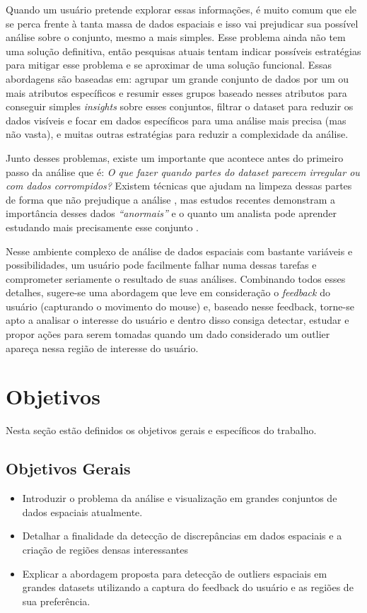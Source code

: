 Quando um usuário pretende explorar essas informações, é muito comum que ele se perca frente à tanta massa de dados espaciais e isso vai prejudicar sua possível análise sobre o conjunto, mesmo a mais simples. Esse problema ainda não tem uma solução definitiva, então pesquisas atuais tentam indicar possíveis estratégias para mitigar esse problema e se aproximar de uma solução funcional. Essas abordagens são baseadas em: agrupar um grande conjunto de dados por um ou mais atributos específicos e resumir esses grupos baseado nesses atributos para conseguir simples \textit{insights} sobre esses conjuntos, filtrar o dataset para reduzir os dados visíveis e focar em dados específicos para uma análise mais precisa (mas não vasta), e muitas outras estratégias para reduzir a complexidade da análise.

Junto desses problemas, existe um importante que acontece antes do primeiro passo da análise que é: \textit{O que fazer quando partes do dataset parecem irregular ou com dados corrompidos?} Existem técnicas que ajudam na limpeza dessas partes de forma que não prejudique a análise \cite{10.1007/978-3-319-11116-2_2}, mas estudos recentes demonstram a importância desses dados \textit{``anormais''} e o quanto um analista pode aprender estudando mais precisamente esse conjunto \cite{DBLP:journals/debu/FreireCVZ16}.

Nesse ambiente complexo de análise de dados espaciais com bastante variáveis e possibilidades, um usuário pode facilmente falhar numa dessas tarefas e comprometer seriamente o resultado de suas análises. Combinando todos esses detalhes, sugere-se uma abordagem que leve em consideração o \textit{feedback} do usuário (capturando o movimento do mouse) e, baseado nesse feedback, torne-se apto a analisar o interesse do usuário e dentro disso consiga detectar, estudar e propor ações para serem tomadas quando um dado considerado um outlier apareça nessa região de interesse do usuário.

\section{Objetivos}

Nesta seção estão definidos os objetivos gerais e específicos do trabalho.

\subsection{Objetivos Gerais}

\begin{itemize}
	\item
		Introduzir o problema da análise e visualização em grandes conjuntos de dados espaciais atualmente.
	\item 
		Detalhar a finalidade da detecção de discrepâncias em dados espaciais e a criação de regiões densas interessantes
	\item
	      Explicar a abordagem proposta para detecção de outliers espaciais em grandes datasets utilizando a captura do feedback do usuário e as regiões de sua preferência.

\end{itemize}

